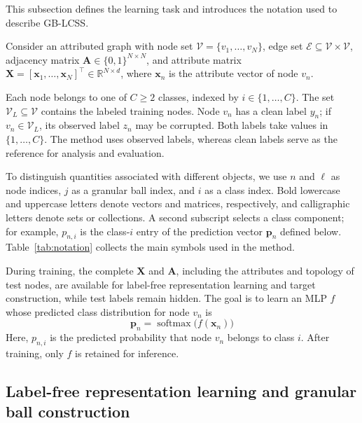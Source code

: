 \documentclass[10pt,letterpaper,nopreprintline]{elsarticle}
\theoremstyle{definition}
\theoremstyle{plain}
\begin{document}
This subsection defines the learning task and introduces the notation used to describe GB-LCSS.

Consider an attributed graph with node set \(\mathcal V=\{v_1,\ldots,v_N\}\), edge set \(\mathcal E\subseteq\mathcal V\times\mathcal V\), adjacency matrix \(\mathbf A\in\{0,1\}^{N\times N}\), and attribute matrix \(\mathbf X=[\mathbf x_1,\ldots,\mathbf x_N]^\top\in\mathbb R^{N\times d}\), where \(\mathbf x_n\) is the attribute vector of node \(v_n\).

Each node belongs to one of \(C\geq2\) classes, indexed by \(i\in\{1,\ldots,C\}\). The set \(\mathcal V_L\subseteq\mathcal V\) contains the labeled training nodes. Node \(v_n\) has a clean label \(y_n\); if \(v_n\in\mathcal V_L\), its observed label \(z_n\) may be corrupted. Both labels take values in \(\{1,\ldots,C\}\). The method uses observed labels, whereas clean labels serve as the reference for analysis and evaluation.

To distinguish quantities associated with different objects, we use \(n\) and \(\ell\) as node indices, \(j\) as a granular ball index, and \(i\) as a class index. Bold lowercase and uppercase letters denote vectors and matrices, respectively, and calligraphic letters denote sets or collections. A second subscript selects a class component; for example, \(p_{n,i}\) is the class-\(i\) entry of the prediction vector \(\mathbf p_n\) defined below. Table~\ref{tab:notation} collects the main symbols used in the method.



During training, the complete \(\mathbf X\) and \(\mathbf A\), including the attributes and topology of test nodes, are available for label-free representation learning and target construction, while test labels remain hidden. The goal is to learn an MLP \(f\) whose predicted class distribution for node \(v_n\) is
\begin{equation}\label{eq:1}
\mathbf p_n=\operatorname{softmax}\bigl(f(\mathbf x_n)\bigr)
\end{equation}
Here, \(p_{n,i}\) is the predicted probability that node \(v_n\) belongs to class \(i\). After training, only \(f\) is retained for inference.

\subsection{Label-free representation learning and granular ball construction}\label{sec:3.2}
\end{document}

